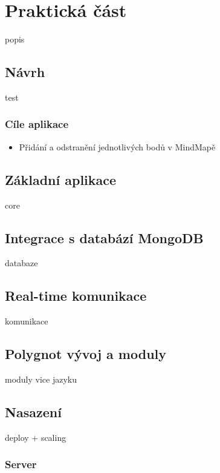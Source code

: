 
\chapter{Praktická část}

popis

\section{Návrh}

test

\subsection{Cíle aplikace}

\begin{itemize}
\item Přidání a odstranění jednotlivých bodů v MindMapě
\end{itemize}

\section{Základní aplikace}

core

\section{Integrace s databází MongoDB}

databaze

\section{Real-time komunikace}

komunikace

\section{Polygnot vývoj a moduly}

moduly vice jazyku

\section{Nasazení}

deploy + scaling

\subsection{Server}

